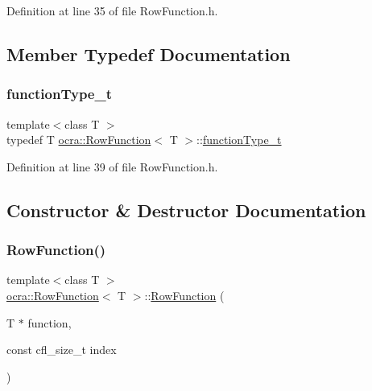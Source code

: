 Definition at line 35 of file Row\+Function.\+h.



\subsection{Member Typedef Documentation}
\hypertarget{classocra_1_1RowFunction_a4b6faf57022f367fdcff681c2dc98306}{}\label{classocra_1_1RowFunction_a4b6faf57022f367fdcff681c2dc98306} 
\subsubsection{\texorpdfstring{function\+Type\+\_\+t}{functionType\_t}}
{\footnotesize\ttfamily template$<$class T $>$ \\
typedef T \hyperlink{classocra_1_1RowFunction}{ocra\+::\+Row\+Function}$<$ T $>$\+::\hyperlink{classocra_1_1RowFunction_a4b6faf57022f367fdcff681c2dc98306}{function\+Type\+\_\+t}}



Definition at line 39 of file Row\+Function.\+h.



\subsection{Constructor \& Destructor Documentation}
\hypertarget{classocra_1_1RowFunction_aed18ba241ac62a2c8013593f424b60d5}{}\label{classocra_1_1RowFunction_aed18ba241ac62a2c8013593f424b60d5} 
\subsubsection{\texorpdfstring{Row\+Function()}{RowFunction()}\hspace{0.1cm}{\footnotesize\ttfamily [1/2]}}
{\footnotesize\ttfamily template$<$class T $>$ \\
\hyperlink{classocra_1_1RowFunction}{ocra\+::\+Row\+Function}$<$ T $>$\+::\hyperlink{classocra_1_1RowFunction}{Row\+Function} (\begin{DoxyParamCaption}\item[{T $\ast$}]{function,  }\item[{const cfl\+\_\+size\+\_\+t}]{index }\end{DoxyParamCaption})\hspace{0.3cm}{\ttfamily [inline]}}



